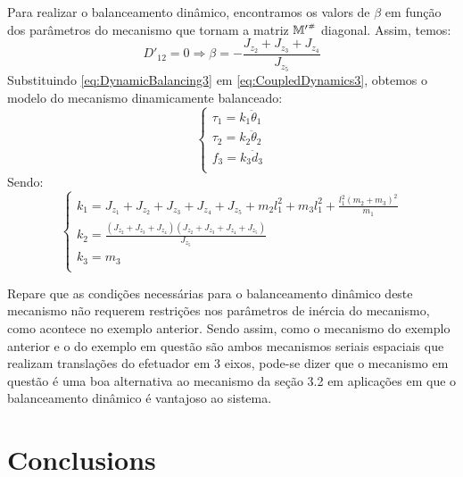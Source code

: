 \documentclass[a4paper,11pt,brazil,fleqn]{article}
\begin{document}
Para realizar o balanceamento din\^{a}mico, encontramos os valors de $\beta$ em fun\c{c}\~{a}o dos par\^ametros do mecanismo que tornam a matriz ${\mathbb{M}'}^{\scriptscriptstyle \#}$ diagonal. Assim, temos:
\begin{equation}\label{eq:DynamicBalancing3}
D'_{12} = 0 \Rightarrow \beta = -\frac{J_{z_2}+J_{z_3}+J_{z_4}}{J_{z_5}}
\end{equation}
Substituindo \eqref{eq:DynamicBalancing3} em \eqref{eq:CoupledDynamics3}, obtemos o modelo do mecanismo dinamicamente balanceado:
\begin{equation}\label{eq:DynamicBalanced3}
\begin{cases}
\tau_1 = k_1 \ddot{\theta}_1 \\
\tau_2 = k_2 \ddot{\theta}_2 \\
f_3 = k_3 \ddot{d}_3 \\
\end{cases}
\end{equation}
Sendo:
\begin{equation}\label{eq:DynamicBalancedKs3}
\begin{cases}
k_1 = J_{z_1} + J_{z_2} + J_{z_3} + J_{z_4} + J_{z_5} + m_2 l_1^2 + m_3 l_1^2 + \frac{l_1^2 (m_2 + m_3)^2}{m_1} \\
k_2 = \frac{(J_{z_2}+J_{z_3}+J_{z_4})(J_{z_2}+J_{z_3}+J_{z_4}+J_{z_5})}{J_{z_5}} \\
k_3 = m_3 \\
\end{cases}
\end{equation}

Repare que as condi\c{c}\~oes necess\'{a}rias para o balanceamento din\^{a}mico deste mecanismo n\~{a}o requerem restri\c{c}\~{o}es nos par\^{a}metros de in\'{e}rcia do mecanismo, como acontece no exemplo anterior. Sendo assim, como o mecanismo do exemplo anterior e o do exemplo em quest\~{a}o s\~{a}o ambos mecanismos seriais espaciais que realizam transla\c{c}\~{o}es do efetuador em 3 eixos, pode-se dizer que o mecanismo em quest\~{a}o \'{e} uma boa alternativa ao mecanismo da se\c{c}\~{a}o 3.2 em aplica\c{c}\~{o}es em que o balanceamento din\^{a}mico \'{e} vantajoso ao sistema.



\section{Conclusions}\label{S04}
\end{document}
